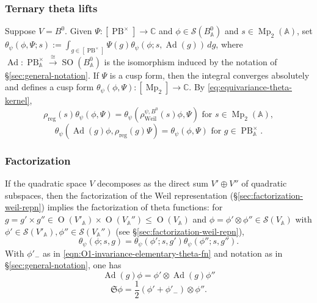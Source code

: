 \documentclass[reqno,10pt]{amsart}
\theoremstyle{plain} %
\theoremstyle{definition}
\theoremstyle{plain} %
\theoremstyle{remark}
\theoremstyle{itplain} %
\theoremstyle{remark} %
\renewcommand{\leq}{\leqslant}
\numberwithin{equation}{section}
\DeclareMathOperator{\Mp}{Mp}
\DeclareMathOperator{\SO}{SO}
\DeclareMathOperator{\Ad}{Ad}
\def\PB{\operatorname{PB}}
\DeclareMathOperator{\Weil}{Weil}
\def\O{\operatorname{O}}
\DeclareMathOperator{\reg}{reg}
\begin{document}
\subsubsection{Ternary theta lifts}
\label{sec-3-2-7}
Suppose $V = B^0$.  Given $\Psi : [\PB^\times] \rightarrow \mathbb{C}$ and $\phi \in \mathcal{S}(B^0_\mathbb{A})$ and $s \in \Mp_2(\mathbb{A})$, set $\theta_{\psi}(\phi,\Psi;s) := \int_{g \in [\PB^\times]} \Psi(g) \theta_{\psi}(\phi;s,\Ad(g)) \,d g$, where $\Ad : \PB^\times_\mathbb{A} \xrightarrow{\cong} \SO(B^0_\mathbb{A})$ is the isomorphism induced by the notation of \S\ref{sec:general-notation}.  If $\Psi$ is a cusp form, then the integral converges absolutely and defines a cusp form $\theta_{\psi}(\phi,\Psi) : [\Mp_2] \rightarrow \mathbb{C}$.
By \eqref{eq:equivariance-theta-kernel},
\begin{equation}\label{eq:equivariance-ttf}
  \rho_{\reg}(s) \theta_{\psi}(\phi,\Psi)
  = \theta_{\psi}(\rho_{\Weil}^{\psi,B^0}(s) \phi, \Psi)
  \text{ for }
  s \in \Mp_2(\mathbb{A}),
\end{equation}
\begin{equation}\label{eq:equivariance-ttf-2}
  \theta_{\psi}(\Ad(g)\phi, \rho_{\reg}(g) \Psi)
  =
  \theta_{\psi}(\phi, \Psi)
  \text{ for }
  g \in \PB^\times_\mathbb{A}.
\end{equation}

\subsubsection{Factorization}
\label{sec-3-2-8}
If the quadratic space $V$ decomposes as the direct sum $V' \oplus V''$ of quadratic subspaces, then the factorization of the Weil representation (\S\ref{sec:factorization-weil-repn}) implies the factorization of theta functions: for $g = g' \times g'' \in \O(V'_\mathbb{A}) \times \O(V_\mathbb{A} '') \leq \O(V_\mathbb{A})$ and $\phi = \phi ' \otimes \phi '' \in \mathcal{S}(V_\mathbb{A})$ with $\phi ' \in \mathcal{S}(V'_\mathbb{A}), \phi '' \in \mathcal{S}(V_\mathbb{A} '')$ (see \S\ref{sec:factorization-weil-repn}),
\begin{equation}\label{eqn:Factorization-of-theta-fns}
  \theta_{\psi}(\phi;s,g)
  =
  \theta_{\psi}(\phi ';s,g')
  \theta_{\psi}(\phi '';s,g'').
\end{equation}
With $\phi '_-$ as in \eqref{eqn:O1-invariance-elementary-theta-fn} and notation as in \S\ref{sec:general-notation}, one has
\begin{equation}\label{eq:action-of-S-on-pure-tensors-for-B-0}
  \Ad(g) \phi = \phi ' \otimes \Ad(g) \phi ''
\end{equation}
\begin{equation}\label{eq:action-of-S-on-pure-tensors-for-B}
  \mathfrak{S} \phi =
  \frac{1}{2} 
  ( \phi ' + \phi '_-)
  \otimes \phi ''.
\end{equation}
\end{document}
